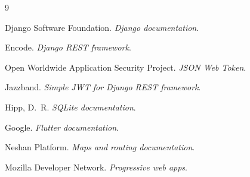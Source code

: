 \clearpage
\setLTRbibitems
\begin{sloppypar}
\begin{thebibliography}{9}

Django Software Foundation.
\newblock \textit{Django documentation}.
\newline{}

Encode.
\newblock \textit{Django REST framework}.
\newline{}

Open Worldwide Application Security Project.
\newblock \textit{JSON Web Token}.
\newline{}

Jazzband.
\newblock \textit{Simple JWT for Django REST framework}.
\newline{}

Hipp, D.~R.
\newblock \textit{SQLite documentation}.
\newline{}

Google.
\newblock \textit{Flutter documentation}.
\newline{}

Neshan Platform.
\newblock \textit{Maps and routing documentation}.
\newline{}

Mozilla Developer Network.
\newblock \textit{Progressive web apps}.
\newline{}

\end{thebibliography}
\end{sloppypar}
